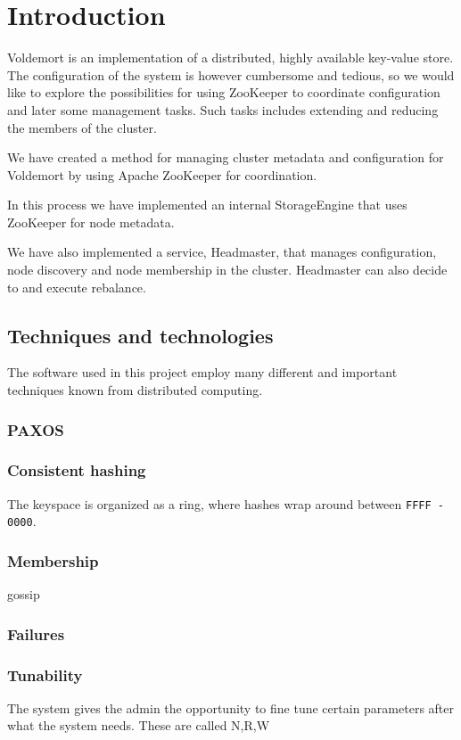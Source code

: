 
\section{Introduction}
Voldemort is an implementation of a distributed, highly available key-value store.
The configuration of the system is however cumbersome and tedious, so we would like to explore the possibilities for using ZooKeeper to coordinate configuration and later some management tasks.
Such tasks includes extending and reducing the members of the cluster.

We have created a method for managing cluster metadata and configuration for Voldemort by using Apache ZooKeeper for coordination.

In this process we have implemented an internal StorageEngine that uses ZooKeeper for node metadata.

We have also implemented a service, Headmaster, that manages configuration, node discovery and node membership in the cluster.
Headmaster can also decide to and execute rebalance.

\subsection{Techniques and technologies}
The software used in this project employ many different and important techniques known from distributed computing.

\subsubsection{PAXOS}

\subsubsection{Consistent hashing}
The keyspace is organized as a ring, where hashes wrap around between \texttt{FFFF - 0000}.

\subsubsection{Membership}
gossip

\subsubsection{Failures}

\subsubsection{Tunability}
The system gives the admin the opportunity to fine tune certain parameters after what the system needs.
These are called N,R,W

